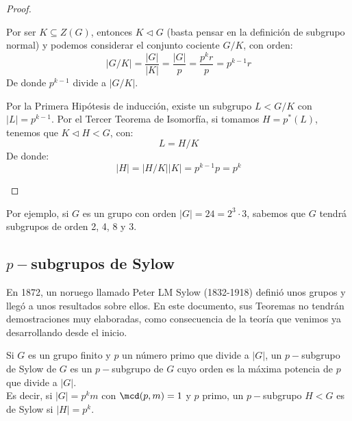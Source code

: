 \begin{teo}
\begin{proof}
\begin{itemize}
\begin{itemize}
\begin{itemize}
                                Por ser $K\subseteq Z(G)$, entonces $K\lhd G$ (basta pensar en la definición de subgrupo normal) y podemos considerar el conjunto cociente $G/K$, con orden:
                                \begin{equation*}
                                    |G/K| = \dfrac{|G|}{|K|} = \dfrac{|G|}{p}  = \dfrac{p^kr}{p} = p^{k-1}r
                                \end{equation*}
                                De donde $p^{k-1}$ divide a $|G/K|$.

                                Por la Primera Hipótesis de inducción, existe un subgrupo $L<G/K$ con $|L| = p^{k-1}$. Por el Tercer Teorema de Isomorfía, si tomamos $H = p^\ast(L)$, tenemos que $K\lhd H < G$, con:
                                \begin{equation*}
                                    L = H/K
                                \end{equation*}
                                De donde:
                                \begin{equation*}
                                    |H| = |H/K| |K| = p^{k-1} p = p^k
                                \end{equation*}
                        \end{itemize}
                        
                \end{itemize}
        \end{itemize}
    \end{proof}
\end{teo}

\begin{ejemplo}
    Por ejemplo, si $G$ es un grupo con orden $|G| = 24 = 2^3 \cdot 3$, sabemos que $G$ tendrá subgrupos de orden 2, 4, 8 y 3.
\end{ejemplo}

\subsection{$p-$subgrupos de Sylow}
\noindent
En 1872, un noruego llamado Peter LM Sylow (1832-1918) definió unos grupos y llegó a unos resultados sobre ellos. En este documento, sus Teoremas no tendrán demostraciones muy elaboradas, como consecuencia de la teoría que venimos ya desarrollando desde el inicio.

\begin{definicion}
    Si $G$ es un grupo finito y $p$ un número primo que divide a $|G|$, un $p-$subgrupo de Sylow de $G$ es un $p-$subgrupo de $G$ cuyo orden es la máxima potencia de $p$ que divide a $|G|$.\\

    \noindent
    Es decir, si $|G| = p^km$ con $\mcd(p,m)=1$ y $p$ primo, un $p-$subgrupo $H<G$ es de Sylow si $|H| = p^k$.
\end{definicion}

